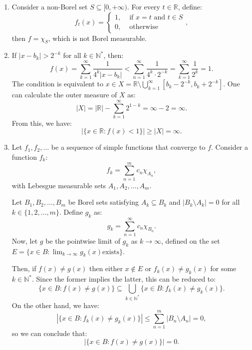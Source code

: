 \begin{enumerate}[label=\textbf{2E.\arabic*}]
  Hence, by picking \( x_{n} \in B(x_{0}, \varepsilon_{n}) \cap B \setminus C
  \), for some \( \varepsilon_{n} \to 0 \), we have a sequence \( x_{n} \in B \)
  satisfying:
  \[
    \lim_{n \to \infty} f(x_{n}) = 0 \neq 1 = f(x_{0})
  .\] 
\item Consider a non-Borel set \( S \subseteq [0, +\infty) \). For every \( t
  \in \mathbb{R} \), define:
  \[
    f_{t}(x) = \begin{cases}
      1, & \text{ if } x = t \text{ and } t \in S\\
      0, &\text{ otherwise}
    \end{cases}
  ,\] then \( f = \chi_{S} \), which is not Borel measurable.
\item If \( |x-b_{k}| > 2^{-k} \) for all \( k \in \mathbb{N}^{*} \),
  then:
  \[
    f(x) = \sum_{k=1}^{\infty} \frac{1}{4^{k}|x-b_{k}|} < \sum_{n=1}^{\infty}
    \frac{1}{4^{k} \cdot 2^{-k}} = \sum_{k = 1}^{\infty} \frac{1}{2^{k}} = 1
  .\] 
  The condition is equivalent to \( x \in X = \mathbb{R} \setminus \bigcup_{k =
  1}^{\infty} [b_{k} - 2^{-k}, b_{k} + 2^{-k}] \). One can calculate the outer
  measure of \( X \) as:
  \[
    |X| = |\mathbb{R}| - \sum_{k = 1}^{\infty} 2^{1-k} = \infty - 2 = \infty
  .\] 
  From this, we have:
  \[
    |\{x \in \mathbb{R}: f(x)<1\}| \ge |X| = \infty
  .\] 
\item 
  Let \( f_{1}, f_{2}, \ldots  \) be a sequence of simple functions that
  converge to \( f \). Consider a function \( f_{k} \):
  \[
    f_{k} = \sum_{n = 1}^{m} c_{n}\chi_{A_{n}}
  ,\] with Lebesgue measurable sets \( A_{1}, A_{2}, \ldots , A_{m} \).

  Let \( B_{1}, B_{2}, \ldots , B_{m} \) be Borel sets satisfying \( A_{k}
  \subseteq B_{k} \) and \( |B_{k} \setminus A_{k}| = 0 \) for all \( k \in \{1,
  2, \ldots , m\}   \). Define \( g_{k} \) as:
  \[
    g_{k} = \sum_{n=1}^{\infty} c_{n}\chi_{B_{n}} 
  .\] 
  Now, let \( g \) be the pointwise limit of \( g_{k} \) as \( k \to \infty \),
  defined on the set \( E = \{x \in B: \lim_{k \to \infty} g_{k}(x) \text{
  exists}\}   \).

  Then, if \( f(x) \neq g(x) \) then either \( x \notin E \) or \( f_{k}(x) \neq
  g_{k}(x)\) for some \( k \in \mathbb{N}^{*} \). Since the former implies the
  latter, this can be reduced to:
  \[
    \{x \in B: f(x)\neq g(x)\}  \subseteq \bigcup_{k \in
    \mathbb{N}^{*}} \{x \in B: f_{k}(x)\neq g_{k}(x)\}  
  .\] 
  On the other hand, we have:
  \[
    |\{x \in B: f_{k}(x) \neq g_{k}(x)\}| \le \sum_{n = 1}^{m} |B_{n} \setminus
    A_{n}| = 0
  ,\] so we can conclude that:
  \[
    |\{x \in B: f(x) \neq  g(x)\}|   = 0
  .\] 
\end{enumerate}


